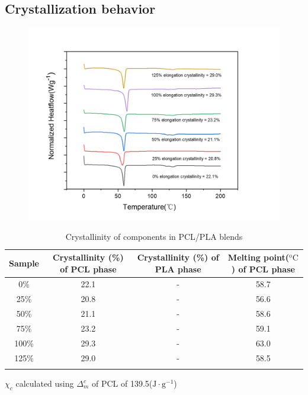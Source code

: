 \documentclass{Head}
\begin{document}
\subsection{Crystallization behavior}
\begin{figure} %
  \includegraphics[scale = 0.5]{figures/DSC_result_1.png}
\end{figure}
\label{sec:result_and_Analysis}
\renewcommand{\tablename}{\textbf{Table}}
\captionsetup[table]{labelsep = period}
\begin{table} %
  \caption{Crystallinity of components in PCL/PLA blends}
  \begin{tabular}{cccc}
    \toprule
    Sample & Crystallinity (\%) of PCL phase & Crystallinity (\%) of PLA phase & Melting point($\mathrm{^o C}$) of PCL phase \\
    \midrule
    0\%    & 22.1                            & -                               & 58.7                                        \\
    25\%   & 20.8                            & -                               & 56.6                                        \\
    50\%   & 21.1                            & -                               & 58.6                                        \\
    75\%   & 23.2                            & -                               & 59.1                                        \\
    100\%  & 29.3                            & -                               & 63.0                                        \\
    125\%  & 29.0                            & -                               & 58.5                                        \\
    \bottomrule
    \label{DSC_result_table}
  \end{tabular}
  $\chi_c $ calculated using $\Delta_m^c$ of PCL of 139.5($\mathrm{J\cdot g^{-1}}$)
\end{table}
\end{document}
